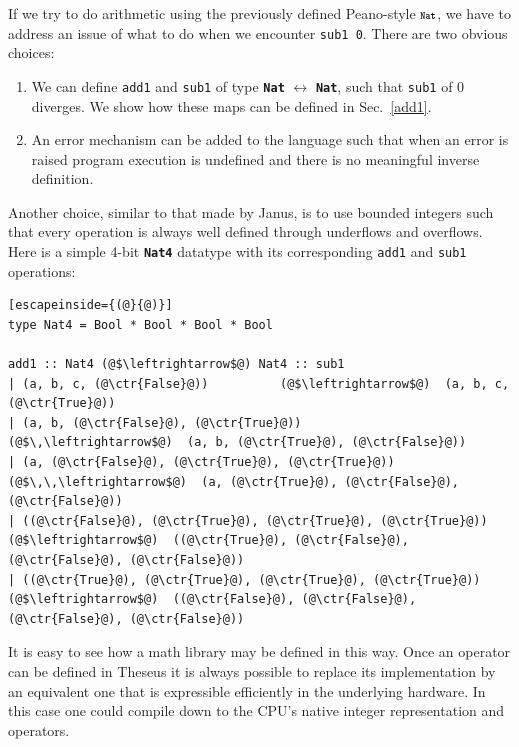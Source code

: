 \documentclass{article}
\newcommand{\kw}[1]{{\scriptsize{\textbf{\texttt{#1}}}}}
\newcommand{\ctr}[1]{{\scriptsize{\texttt{#1}}}}
\begin{document}
If we try to do arithmetic using the previously defined Peano-style \ensuremath{\kw{Nat} },
we have to address an issue of what to do when we encounter
\lstinline{sub1 0}. There are two obvious choices:
\begin{enumerate}
\item We can define \ctr{add1} and \ctr{sub1} of type \kw{Nat}
  $\leftrightarrow$ \kw{Nat}, such that \ctr{sub1} of {\scriptsize{0}}
  diverges. We show how these maps can be defined in Sec.~\ref{add1}.
\item An error mechanism can be added to the language such that when
  an error is raised program execution is undefined and there is no
  meaningful inverse definition.
\end{enumerate}
Another choice, similar to that made by Janus, is to use bounded integers
such that every operation is always well defined through underflows and
overflows. Here is a simple 4-bit \kw{Nat4} datatype with its corresponding
\ctr{add1} and \ctr{sub1} operations:
\begin{lstlisting}[escapeinside={(@}{@)}]
type Nat4 = Bool * Bool * Bool * Bool

add1 :: Nat4 (@$\leftrightarrow$@) Nat4 :: sub1
| (a, b, c, (@\ctr{False}@))          (@$\leftrightarrow$@)  (a, b, c, (@\ctr{True}@))
| (a, b, (@\ctr{False}@), (@\ctr{True}@))       (@$\,\leftrightarrow$@)  (a, b, (@\ctr{True}@), (@\ctr{False}@))
| (a, (@\ctr{False}@), (@\ctr{True}@), (@\ctr{True}@))    (@$\,\,\leftrightarrow$@)  (a, (@\ctr{True}@), (@\ctr{False}@), (@\ctr{False}@))
| ((@\ctr{False}@), (@\ctr{True}@), (@\ctr{True}@), (@\ctr{True}@))  (@$\leftrightarrow$@)  ((@\ctr{True}@), (@\ctr{False}@), (@\ctr{False}@), (@\ctr{False}@))
| ((@\ctr{True}@), (@\ctr{True}@), (@\ctr{True}@), (@\ctr{True}@))   (@$\leftrightarrow$@)  ((@\ctr{False}@), (@\ctr{False}@), (@\ctr{False}@), (@\ctr{False}@))
 \end{lstlisting}

\noindent It is easy to see how a math library may be defined in this
way. Once an operator can be defined in Theseus it is always possible to
replace its implementation by an equivalent one that is expressible
efficiently in the underlying hardware. In this case one could compile down
to the CPU's native integer representation and operators.
\end{document}
